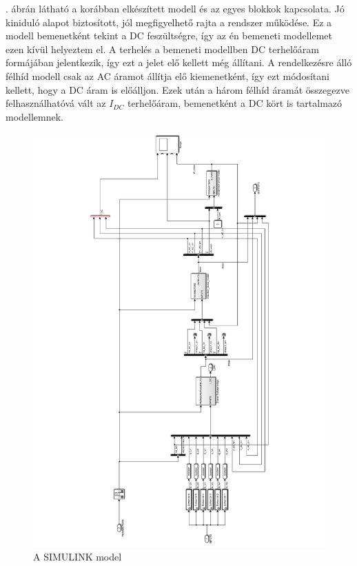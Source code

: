. ábrán látható a korábban elkészített modell és az egyes blokkok kapcsolata. Jó kiniduló alapot biztosított, jól megfigyelhető rajta a rendszer működése. Ez a modell bemenetként tekint a DC feszültségre, így az én bemeneti modellemet ezen kívül helyeztem el. A terhelés a bemeneti modellben DC terhelőáram formájában jelentkezik, így ezt a jelet elő kellett még állítani. A rendelkezésre álló félhíd modell csak az AC áramot állítja elő kiemenetként, így ezt módosítani kellett, hogy a DC áram is előálljon. Ezek után a három félhíd áramát összegezve felhasználhatóvá vált az $I_{DC}$ terhelőáram, bemenetként a DC kört is tartalmazó modellemnek.


\begin{figure}[]
	\centering
	\includegraphics[width = \textwidth]{figures/hil_model.pdf}
	\caption{A SIMULINK model} 
	\label{fig:original_model}
\end{figure}


